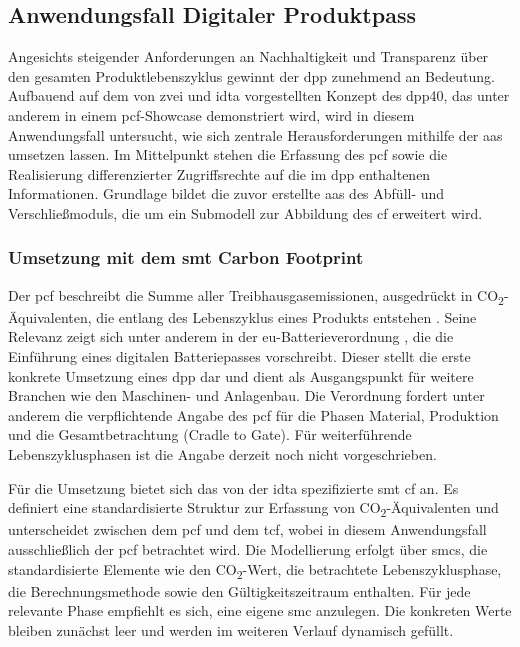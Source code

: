 
\newpage
\subsection{Anwendungsfall Digitaler Produktpass}
Angesichts steigender Anforderungen an Nachhaltigkeit und Transparenz über den gesamten Produktlebenszyklus gewinnt der \acs{dpp} zunehmend an Bedeutung.
Aufbauend auf dem von \acs{zvei} und \acs{idta} vorgestellten Konzept des \acs{dpp40}, das unter anderem in einem \acs{pcf}-Showcase \cite{PCFShowcas} demonstriert wird, wird in diesem Anwendungsfall untersucht, wie sich zentrale Herausforderungen mithilfe der \acs{aas} umsetzen lassen.
Im Mittelpunkt stehen die Erfassung des \acs{pcf} sowie die Realisierung differenzierter Zugriffsrechte auf die im \acs{dpp} enthaltenen Informationen.
Grundlage bildet die zuvor erstellte \acs{aas} des Abfüll- und Verschließmoduls, die um ein Submodell zur Abbildung des \acs{cf} erweitert wird.

\subsubsection{Umsetzung mit dem \acs{smt} Carbon Footprint}
Der \acs{pcf} beschreibt die Summe aller Treibhausgasemissionen, ausgedrückt in CO\textsubscript{2}-Äqui\-valenten, die entlang des Lebenszyklus eines Produkts entstehen \cite{PCF}. 
Seine Relevanz zeigt sich unter anderem in der \acs{eu}-Batterieverordnung \cite{EUVerordnung}, die die Einführung eines digitalen Batteriepasses vorschreibt. 
Dieser stellt die erste konkrete Umsetzung eines \acs{dpp} dar und dient als Ausgangspunkt für weitere Branchen wie den Maschinen- und Anlagenbau. 
Die Verordnung fordert unter anderem die verpflichtende Angabe des \acs{pcf} für die Phasen Material, Produktion und die Gesamtbetrachtung (Cradle to Gate). 
Für weiterführende Lebenszyklusphasen ist die Angabe derzeit noch nicht vorgeschrieben.

Für die Umsetzung bietet sich das von der \acs{idta} spezifizierte \acs{smt} \acs{cf} \cite{SpezifikaitonPCF} an.
Es definiert eine standardisierte Struktur zur Erfassung von CO\textsubscript{2}-Äquivalenten und unterscheidet zwischen dem \acs{pcf} und dem \ac{tcf}, wobei in diesem Anwendungsfall ausschließlich der \acs{pcf} betrachtet wird.
Die Modellierung erfolgt über \acsp{smc}, die standardisierte Elemente wie den CO\textsubscript{2}-Wert, die betrachtete Lebenszyklusphase, die Berechnungsmethode sowie den Gültigkeitszeitraum enthalten.
Für jede relevante Phase empfiehlt es sich, eine eigene \acs{smc} anzulegen.
Die konkreten Werte bleiben zunächst leer und werden im weiteren Verlauf dynamisch gefüllt.

